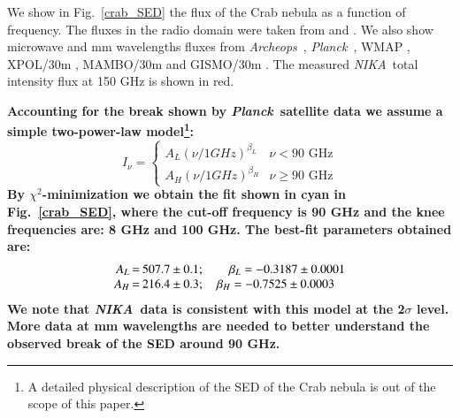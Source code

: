 \documentclass[twocolumn,traditabstract]{aa}
\def\NIKA{\textit{NIKA}}
\def\Archeops{\textit{Archeops}}
\def\Planck{\textit{Planck}}
\begin{document}
We show in Fig.~\ref{crab_SED} the flux of the Crab nebula as a function of frequency. The fluxes in the radio domain were taken from \cite{dmitrenko1970absolute} and \cite{1971IzVUZ..14..157V}. We also show microwave and mm wavelengths fluxes from \Archeops\ \citep{macias2007archeops}, \Planck\ \citep{2015arXiv150702058P}, WMAP \citep{2011ApJS..192...19W}, XPOL/30m \citep{aumont2010}, MAMBO/30m \citep{2002A&A...386.1044B} and GISMO/30m \citep{2011ApJ...734...54A}. The measured \NIKA\ total intensity flux at 150 GHz is shown in red.

\textbf{Accounting for the break shown by \Planck\ satellite data we assume a simple
two-power-law model\footnote{A detailed physical description of the SED of the
  Crab nebula is out of the scope of this paper.}:
\begin{equation}
I_{\nu} = \left\{ 
\begin{array}{rl}A_L(\nu/1GHz)^{\beta_L} &\mbox{$\nu<90$ GHz} \\
   A_H(\nu/1GHz)^{\beta_H} &\mbox{$\nu\geq90$ GHz}
  \end{array} \right.    
\end{equation}
By $\chi^2$-minimization we obtain the fit shown in cyan in Fig.~\ref{crab_SED},
where the cut-off frequency is 90 GHz and the knee frequencies are: 8 GHz and 100 GHz. 
The best-fit parameters obtained are:
$$\setlength\arraycolsep{0.1em}
 \begin{array}{rclcl}
  A_L&=& 507.7\pm0.1 ; \quad \quad   \beta_L = -0.3187\pm0.0001\\
  A_H&=& 216.4\pm0.3 ; \quad \beta_H = -0.7525\pm0.0003
 \end{array}
$$
We note that \NIKA\ data is consistent with this model at the 2$\sigma$ level. More data at mm wavelengths are needed to better understand the observed break of the SED around 90 GHz. }
\end{document}
